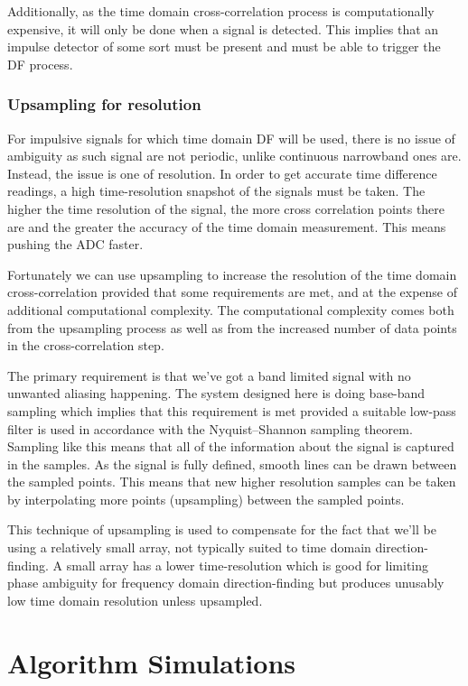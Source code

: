 Additionally, as the time domain cross-correlation process is computationally expensive, it will only be done when a signal is detected. This implies that an impulse detector of some sort must be present and must be able to trigger the DF process.

\subsubsection{Upsampling for resolution}
For impulsive signals for which time domain DF will be used, there is no issue of ambiguity as such signal are not periodic, unlike continuous narrowband ones are. Instead, the issue is one of resolution. In order to get accurate time difference readings, a high time-resolution snapshot of the signals must be taken. The higher the time resolution of the signal, the more cross correlation points there are and the greater the accuracy of the time domain measurement. This means pushing the ADC faster.

Fortunately we can use upsampling to increase the resolution of the time domain cross-correlation provided that some requirements are met, and at the expense of additional computational complexity. The computational complexity comes both from the upsampling process as well as from the increased number of data points in the cross-correlation step.

The primary requirement is that we've got a band limited signal with no unwanted aliasing happening. The system designed here is doing base-band sampling which implies that this requirement is met provided a suitable low-pass filter is used in accordance with the Nyquist–Shannon sampling theorem. Sampling like this means that all of the information about the signal is captured in the samples. As the signal is fully defined, smooth lines can be drawn between the sampled points. This means that new higher resolution samples can be taken by interpolating more points (upsampling) between the sampled points.

This technique of upsampling is used to compensate for the fact that we'll be using a relatively small array, not typically suited to time domain direction-finding. A small array has a lower time-resolution which is good for limiting phase ambiguity for frequency domain direction-finding but produces unusably low time domain resolution unless upsampled.

\section{Algorithm Simulations}
